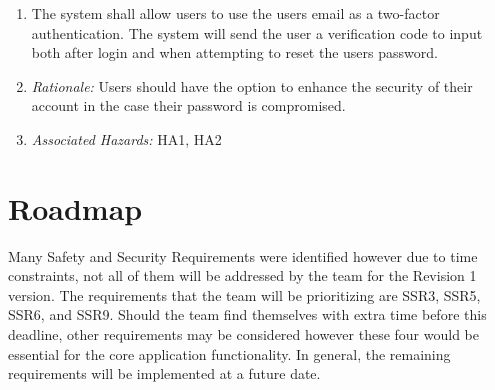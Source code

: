 \documentclass{article}
\begin{document}
\begin{enumerate}[label=SSR\arabic*.]
    \item The system shall allow users to use the users email as a two-factor authentication. The system will send the user a verification code to input both after login and when attempting to reset the users password.
    \item[] \emph{Rationale:} Users should have the option to enhance the security of their account in the case their password is compromised.
    \item[] \emph{Associated Hazards:} HA1, HA2


\end{enumerate}

\section{Roadmap}

Many Safety and Security Requirements were identified however due to time constraints,
not all of them will be addressed by the team for the Revision 1 version. The requirements
that the team will be prioritizing are SSR3, SSR5, SSR6, and SSR9. Should the team find themselves
with extra time before this deadline, other requirements may be considered however these four
would be essential for the core application functionality. In general, the remaining requirements
will be implemented at a future date.
\end{document}

